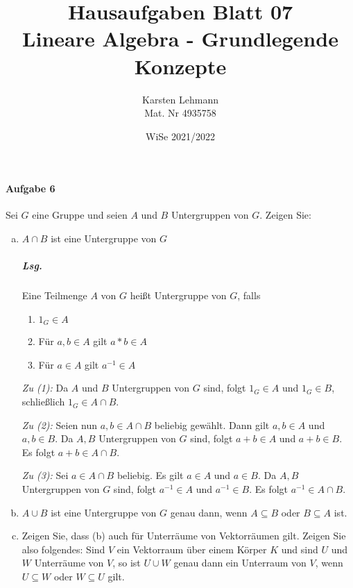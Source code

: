 \documentclass{scrreprt}
\author{Karsten Lehmann\\Mat. Nr 4935758}
\date{WiSe 2021/2022}
\title{Hausaufgaben Blatt 07\\Lineare Algebra - Grundlegende Konzepte}
\begin{document}
\paragraph{Aufgabe 6}
Sei $G$ eine Gruppe und seien $A$ und $B$ Untergruppen von $G$.
Zeigen Sie:
\begin{enumerate}[(a)]
\item $A \cap B$ ist eine Untergruppe von $G$

  \subparagraph{Lsg.} Eine Teilmenge $A$ von $G$ heißt Untergruppe von $G$,
  falls
  \begin{enumerate}[(1)]
  \item $1_G \in A$
  \item Für $a, b \in A$ gilt $a * b \in A$
  \item Für $a \in A$ gilt $a^{-1} \in A$
  \end{enumerate}

  \emph{Zu (1):} Da $A$ und $B$ Untergruppen von $G$ sind, folgt $1_G \in A$ und
  $1_G \in B$, schließlich $1_G \in A \cap B$.

  \emph{Zu (2):} Seien nun $a, b \in A \cap B$ beliebig gewählt.
  Dann gilt $a, b \in A$ und $a, b \in B$.
  Da $A, B$ Untergruppen von $G$ sind, folgt $a + b \in A$ und $a + b \in B$.
  Es folgt $a + b \in A \cap B$.

  \emph{Zu (3):} Sei $a \in A \cap B$ beliebig.
  Es gilt $a \in A$ und $a \in B$.
  Da $A, B$ Untergruppen von $G$ sind, folgt $a^{-1} \in A$ und $a^{-1} \in B$.
  Es folgt $a^{-1} \in A \cap B$.

\item $A \cup B$ ist eine Untergruppe von $G$ genau dann, wenn
  $A \subseteq B$ oder $B \subseteq A$ ist.

\item Zeigen Sie, dass (b) auch für Unterräume von Vektorräumen gilt.
  Zeigen Sie also folgendes: Sind $V$ ein Vektorraum über einem Körper $K$
  und sind $U$ und $W$ Unterräume von $V$, so ist $U \cup W$ genau dann ein
  Unterraum von $V$, wenn $U \subseteq W$ oder $W \subseteq U$ gilt.
\end{enumerate}
\end{document}
